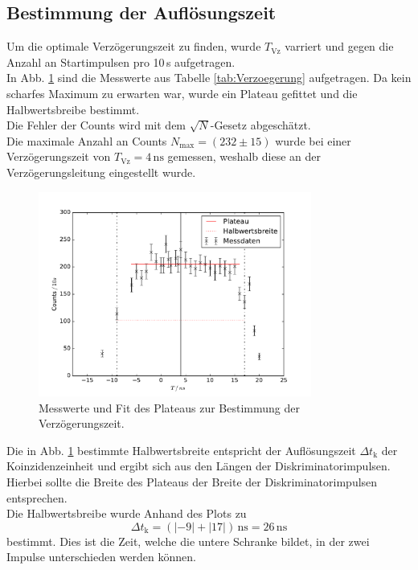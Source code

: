 \subsection{Bestimmung der Auflösungszeit}
Um die optimale Verzögerungszeit zu finden, wurde  $T_\text{Vz}$ varriert und gegen die Anzahl an Startimpulsen pro 10\,s aufgetragen.\\
In Abb. \ref{fig:Verzoegerung} sind die Messwerte aus Tabelle \ref{tab:Verzoegerung} aufgetragen. Da kein scharfes Maximum zu erwarten war,
wurde ein Plateau gefittet und die Halbwertsbreibe bestimmt.\\
Die Fehler der Counts wird mit dem $\sqrt{N}$-Gesetz abgeschätzt.\\
Die maximale Anzahl an Counts $N_{\text{max}}=(232\pm15)$ wurde bei einer Verzögerungszeit von $T_\text{Vz}=4\,\text{ns}$ gemessen, weshalb diese
an der Verzögerungsleitung eingestellt wurde.
\begin{figure}
  \centering
  \includegraphics[width=0.8\textwidth]{plots/plotVerzoegerung.pdf}
  \caption{Messwerte und Fit des Plateaus zur Bestimmung der Verzögerungszeit.}
  \label{fig:Verzoegerung}
\end{figure}
Die in Abb. \ref{fig:Verzoegerung} bestimmte Halbwertsbreite entspricht der Auflösungszeit $\Delta t_{\text{k}}$
der Koinzidenzeinheit und ergibt sich aus den Längen der Diskriminatorimpulsen.
Hierbei sollte die Breite des Plateaus der Breite der Diskriminatorimpulsen entsprechen.\\
Die Halbwertsbreibe wurde Anhand
des Plots zu
\begin{equation*}
  \Delta t_{\text{k}}=(|-9|+|17|)\,\text{ns}=26\,\text{ns}
\end{equation*}
bestimmt.
Dies ist die Zeit, welche die untere Schranke bildet, in der zwei Impulse unterschieden werden können.\\
